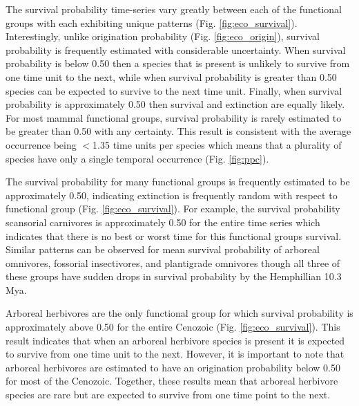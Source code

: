 \documentclass[12pt,letterpaper]{article}
\begin{document}
The survival probability time-series vary greatly between each of the functional groups with each exhibiting unique patterns (Fig. \ref{fig:eco_survival}). Interestingly, unlike origination probability (Fig. \ref{fig:eco_origin}), survival probability is frequently estimated with considerable uncertainty. When survival probability is below 0.50 then a species that is present is unlikely to survive from one time unit to the next, while when survival probability is greater than 0.50 species can be expected to survive to the next time unit. Finally, when survival probability is approximately 0.50 then survival and extinction are equally likely. For most mammal functional groups, survival probability is rarely estimated to be greater than 0.50 with any certainty. This result is consistent with the average occurrence being \(<\)1.35 time units per species which means that a plurality of species have only a single temporal occurrence (Fig. \ref{fig:ppc}).

The survival probability for many functional groups is frequently estimated to be approximately 0.50, indicating extinction is frequently random with respect to functional group (Fig. \ref{fig:eco_survival}). For example, the survival probability scansorial carnivores is approximately 0.50 for the entire time series which indicates that there is no best or worst time for this functional groups survival. Similar patterns can be observed for mean survival probability of arboreal omnivores, fossorial insectivores, and plantigrade omnivores though all three of these groups have sudden drops in survival probability by the Hemphillian 10.3 Mya.

Arboreal herbivores are the only functional group for which survival probability is approximately above 0.50 for the entire Cenozoic (Fig. \ref{fig:eco_survival}). This result indicates that when an arboreal herbivore species is present it is expected to survive from one time unit to the next. However, it is important to note that arboreal herbivores are estimated to have an origination probability below 0.50 for most of the Cenozoic. Together, these results mean that arboreal herbivore species are rare but are expected to survive from one time point to the next.
\end{document}
